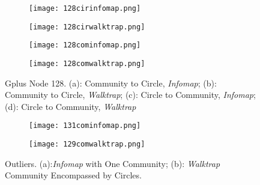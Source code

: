 \begin{figure}[h]
	\centering
	\begin{subfigure}{.5\textwidth}
		\centering
		\texttt{[image: 128cirinfomap.png]}
		\caption{}		
		\label{fig:128cirinfomap}
	\end{subfigure}%
	\begin{subfigure}{.5\textwidth}
		\centering
		\texttt{[image: 128cirwalktrap.png]}
		\caption{}	
		\label{fig:128cirwalktrap}
	\end{subfigure}
	\begin{subfigure}{.7\textwidth}
		\centering
		\texttt{[image: 128cominfomap.png]}
		\caption{}	
		\label{fig:128cominfomap}
	\end{subfigure}
	\begin{subfigure}{.7\textwidth}
		\centering
		\texttt{[image: 128comwalktrap.png]}
		\caption{}	
		\label{fig:128comwalktrap}
	\end{subfigure}
	\caption{Gplus Node 128. (a): Community to Circle, \textit{Infomap}; (b): Community to Circle, \textit{Walktrap}; (c): Circle to Community, \textit{Infomap}; (d): Circle to Community, \textit{Walktrap}}
	\label{fig:128}
\end{figure}

\begin{figure}[h]
	\centering
	\begin{subfigure}{.5\textwidth}
		\centering
		\texttt{[image: 131cominfomap.png]}
		\caption{}		
		\label{fig:131}
	\end{subfigure}%
	\begin{subfigure}{.5\textwidth}
		\centering
		\texttt{[image: 129comwalktrap.png]}
		\caption{}	
		\label{fig:129}
	\end{subfigure}
	\caption{Outliers. (a):\textit{Infomap} with One Community; (b): \textit{Walktrap} Community Encompassed by Circles.}
	\label{fig:last} 
\end{figure}

